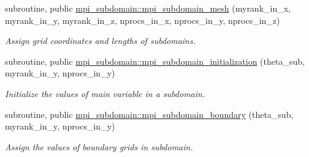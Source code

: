\begin{DoxyCompactItemize}
subroutine, public \mbox{\hyperlink{namespacempi__subdomain_a612331eead74041f174ece9a572c7427}{mpi\+\_\+subdomain\+::mpi\+\_\+subdomain\+\_\+mesh}} (myrank\+\_\+in\+\_\+x, myrank\+\_\+in\+\_\+y, myrank\+\_\+in\+\_\+z, nprocs\+\_\+in\+\_\+x, nprocs\+\_\+in\+\_\+y, nprocs\+\_\+in\+\_\+z)
\begin{DoxyCompactList}\small\item\em Assign grid coordinates and lengths of subdomains. \end{DoxyCompactList}\item 
subroutine, public \mbox{\hyperlink{namespacempi__subdomain_a7cc0deb85b84358eb7addeea849733c4}{mpi\+\_\+subdomain\+::mpi\+\_\+subdomain\+\_\+initialization}} (theta\+\_\+sub, myrank\+\_\+in\+\_\+y, nprocs\+\_\+in\+\_\+y)
\begin{DoxyCompactList}\small\item\em Initialize the values of main variable in a subdomain. \end{DoxyCompactList}\item 
subroutine, public \mbox{\hyperlink{namespacempi__subdomain_a55659431068678c08d21847338390ea8}{mpi\+\_\+subdomain\+::mpi\+\_\+subdomain\+\_\+boundary}} (theta\+\_\+sub, myrank\+\_\+in\+\_\+y, nprocs\+\_\+in\+\_\+y)
\begin{DoxyCompactList}\small\item\em Assign the values of boundary grids in subdomain. \end{DoxyCompactList}\end{DoxyCompactItemize}

